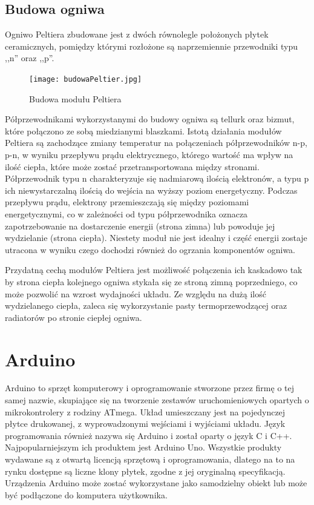 \subsection{Budowa ogniwa} %
Ogniwo Peltiera zbudowane jest z dwóch równolegle położonych płytek ceramicznych, pomiędzy którymi rozłożone są naprzemiennie przewodniki typu ,,n'' oraz ,,p''. 
\begin{figure}[H]
	\centering
	\texttt{[image: budowaPeltier.jpg]}
	\caption{Budowa modułu Peltiera}
\end{figure}
Półprzewodnikami wykorzystanymi do budowy ogniwa są tellurk oraz bizmut, które połączono ze sobą miedzianymi blaszkami. Istotą działania modułów Peltiera są zachodzące zmiany temperatur na połączeniach półprzewodników n-p, p-n, w wyniku przepływu prądu elektrycznego, którego wartość ma wpływ na ilość ciepła, które może zostać przetransportowana między stronami. Półprzewodnik typu n charakteryzuje się nadmiarową ilością elektronów, a typu p ich niewystarczalną ilością do wejścia na wyższy poziom energetyczny. Podczas przepływu prądu, elektrony przemieszczają się między poziomami energetycznymi, co w zależności od typu półprzewodnika oznacza zapotrzebowanie na dostarczenie energii (strona zimna) lub powoduje jej wydzielanie (strona ciepła). Niestety moduł nie jest idealny i część energii zostaje utracona w wyniku czego dochodzi również do ogrzania komponentów ogniwa.

Przydatną cechą modułów Peltiera jest możliwość połączenia ich kaskadowo tak by strona ciepła kolejnego ogniwa stykała się ze stroną zimną poprzedniego, co może pozwolić na wzrost wydajności układu. Ze względu na dużą ilość wydzielanego ciepła, zaleca się wykorzystanie pasty termoprzewodzącej oraz radiatorów po stronie ciepłej ogniwa.



\section{Arduino} %
Arduino to sprzęt komputerowy i oprogramowanie stworzone przez firmę o tej samej nazwie, skupiające się na tworzenie zestawów uruchomieniowych opartych o mikrokontrolery z rodziny ATmega. Układ umieszczany jest na pojedynczej płytce drukowanej, z wyprowadzonymi wejściami i wyjściami układu. Język programowania  również nazywa się Arduino i został oparty o język C i C++. Najpopularniejszym ich produktem jest Arduino Uno. Wszystkie produkty wydawane są z otwartą licencją sprzętową i oprogramowania, dlatego na to na rynku dostępne są liczne klony płytek, zgodne z jej oryginalną specyfikacją. Urządzenia Arduino
może zostać wykorzystane jako samodzielny obiekt lub może być podłączone do komputera użytkownika.
